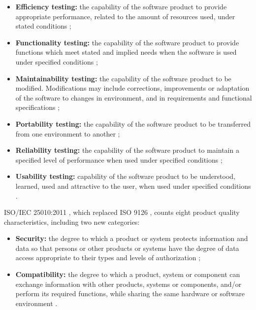 \begin{itemize}
    \item \textbf{Efficiency testing:} the capability of the
        software product to provide appropriate performance,
        related to the amount of resources used, under stated
        conditions \cite{iso9126};

    \item \textbf{Functionality testing:} the capability of the
        software product to provide functions which meet stated
        and implied needs when the software is used under
        specified conditions \cite{iso9126};

    \item \textbf{Maintainability testing:} the capability of the
        software product to be modified. Modifications may
        include corrections, improvements or adaptation of the
        software to changes in environment, and in requirements
        and functional specifications \cite{iso9126};

    \item \textbf{Portability testing:} the capability of the
        software product to be transferred from one environment
        to another \cite{iso9126};

    \item \textbf{Reliability testing:} the capability of the
        software product to maintain a specified level of
        performance when used under specified conditions
        \cite{iso9126};

    \item \textbf{Usability testing:} capability of the software
        product to be understood, learned, used and attractive to
        the user, when used under specified conditions
        \cite{iso9126}.
\end{itemize}

ISO/IEC 25010:2011 \cite{10951538}, which replaced ISO 9126
\cite{iso9126}, counts eight product quality characteristics,
including two new categories:

\begin{itemize}
    \item \textbf{Security:} the degree to which a product or
        system protects information and data so that persons or
        other products or systems have the degree of data access
        appropriate to their types and levels of authorization
        \cite{10951538};

    \item \textbf{Compatibility:} the degree to which a product,
        system or component can exchange information with other
        products, systems or components, and/or perform its
        required functions, while sharing the same hardware or
        software environment \cite{10951538}.
\end{itemize}

